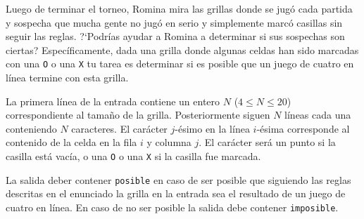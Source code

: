 \documentclass{oci}
\begin{document}
\begin{problemDescription}
\begin{center}
\begin{tikzpicture}[scale=0.58]
  \end{tikzpicture}
  \end{center}

  Luego de terminar el torneo, Romina mira
  las grillas donde se jugó cada partida
  y sospecha que mucha gente no jugó en serio y
  simplemente marcó casillas sin seguir las reglas.
  ?`Podrías ayudar a Romina a determinar si sus sospechas
  son ciertas?
  Específicamente, dada una grilla donde algunas
  celdas han sido marcadas con una \texttt{O} o una \texttt{X}
  tu tarea es determinar si es posible que un juego de cuatro en
  línea termine con esta grilla.
\end{problemDescription}

\begin{inputDescription}
  La primera línea de la entrada contiene un entero $N$ ($4\leq N \leq 20$)
  correspondiente
  al tamaño de la grilla.
  Posteriormente siguen $N$ líneas cada una conteniendo $N$ caracteres.
  El carácter $j$-ésimo en la línea $i$-ésima corresponde al contenido
  de la celda en la fila $i$ y columna $j$.
  El carácter será un punto si la casilla está vacía, o
  una \texttt{O} o una \texttt{X} si la casilla fue marcada.
\end{inputDescription}

\begin{outputDescription}
  La salida deber contener \texttt{posible} en caso de ser posible
  que siguiendo las reglas descritas en el enunciado la grilla en la
  entrada sea el resultado de un juego de cuatro en línea.
  En caso de no ser posible la salida debe contener \texttt{imposible}.
\end{outputDescription}
\end{document}
